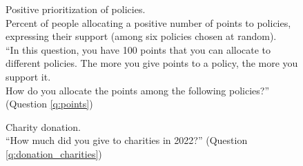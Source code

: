 \begin{figure}[h!] 
    \caption[Positive prioritization of policies]{Positive prioritization of policies. \\ Percent of people allocating a positive number of points to policies, expressing their support (among six policies chosen at random). \\ ``In this question, you have 100 points that you can allocate to different policies. The more you give points to a policy, the more you support it. \\ How do you allocate the points among the following policies?'' (Question \ref{q:points})}\label{fig:points_positive}
\end{figure}

\begin{figure}[h!]
    \caption[Charity donation]{Charity donation. \\ ``How much did you give to charities in 2022?'' (Question \ref{q:donation_charities})}\label{fig:donation_charities}
\end{figure}

